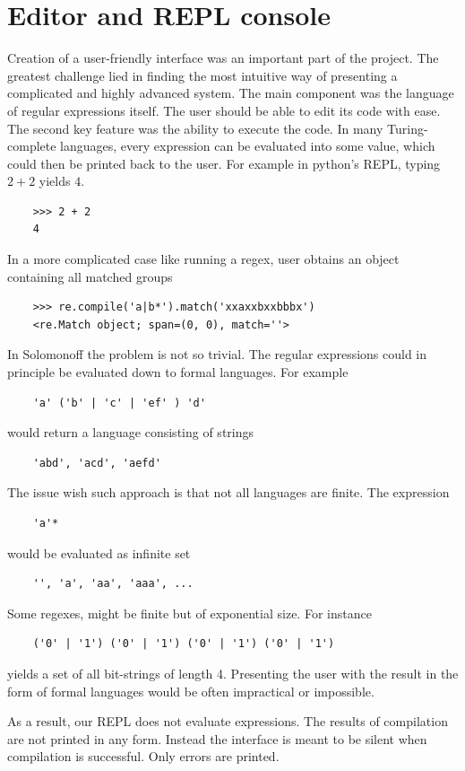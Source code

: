 
\section{Editor and REPL console}

Creation of a user-friendly interface was an important part of the project.
The greatest challenge lied in finding the most intuitive way of presenting a complicated and highly advanced system. The main component was the language of regular expressions itself. The user should be able to edit its code with ease. The second key feature was the ability to execute the code. 
In many Turing-complete languages, every expression can be evaluated into some value, which could then be printed back to the user. For example in python's REPL, typing $2+2$ yields $4$.
\begin{lstlisting}
	>>> 2 + 2
	4
\end{lstlisting}
In a more complicated case like running a regex, user obtains an object containing all matched groups
\begin{lstlisting}
	>>> re.compile('a|b*').match('xxaxxbxxbbbx')
	<re.Match object; span=(0, 0), match=''>
\end{lstlisting}
In Solomonoff the problem is not so trivial. The regular expressions could in principle be evaluated down to formal languages. For example 
\begin{lstlisting}
	'a' ('b' | 'c' | 'ef' ) 'd'
\end{lstlisting}
would return a language consisting of strings
\begin{lstlisting}
	'abd', 'acd', 'aefd'
\end{lstlisting}
The issue wish such approach is that not all languages are finite. The expression
\begin{lstlisting}
	'a'*
\end{lstlisting}
would be evaluated as infinite set
\begin{lstlisting}
	'', 'a', 'aa', 'aaa', ...
\end{lstlisting}
Some regexes, might be finite but of exponential size. For instance
\begin{lstlisting}
	('0' | '1') ('0' | '1') ('0' | '1') ('0' | '1')
\end{lstlisting}
yields a set of all bit-strings of length 4. Presenting the user with the result in the form of formal languages would be often impractical or impossible. 

As a result, our REPL does not evaluate expressions. The results of compilation are not printed in any form. Instead the interface is meant to be silent when compilation is successful. Only errors are printed. 

